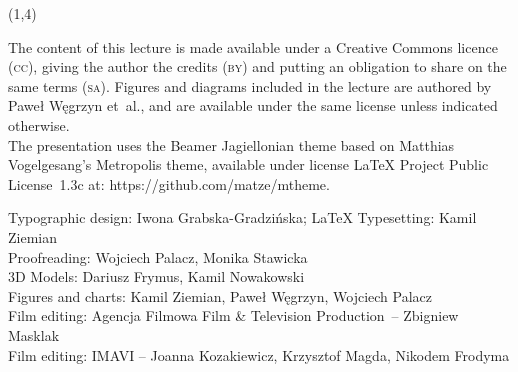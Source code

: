 {\begin{frame}[standout]
\begin{textblock}{4.2}
    \end{textblock}





    \begin{textblock}{11}(1,4)

      \begin{flushleft}

        \mdseries

        \footnotesize

        \RaggedRight

        \color{jFrametitleFGColor}

        The content of this lecture is made available under a Creative
        Commons licence (\textsc{cc}), giving the author the credits
        (\textsc{by}) and putting an obligation to share on the same terms
        (\textsc{sa}). Figures and diagrams included in the lecture are
        authored by Paweł Węgrzyn et~al., and are available under the same
        license unless indicated otherwise.\\ The presentation uses the
        Beamer Jagiellonian theme based on Matthias Vogelgesang’s
        Metropolis theme, available under license \LaTeX{} Project
        Public License~1.3c at: 
        {https://github.com/matze/mtheme}.

        Typographic design: Iwona Grabska-Gradzińska;
        \LaTeX{} Typesetting: Kamil Ziemian \\
        Proofreading: Wojciech Palacz,
        Monika Stawicka \\
        3D Models: Dariusz Frymus, Kamil Nowakowski \\
        Figures and charts: Kamil Ziemian, Paweł Węgrzyn, Wojciech
        Palacz \\
        Film editing: Agencja Filmowa Film \& Television Production~--
        Zbigniew Masklak \\
        Film editing: IMAVI -- Joanna Kozakiewicz, Krzysztof Magda, Nikodem
        Frodyma

      \end{flushleft}

    \end{textblock}

  \end{frame}
}




